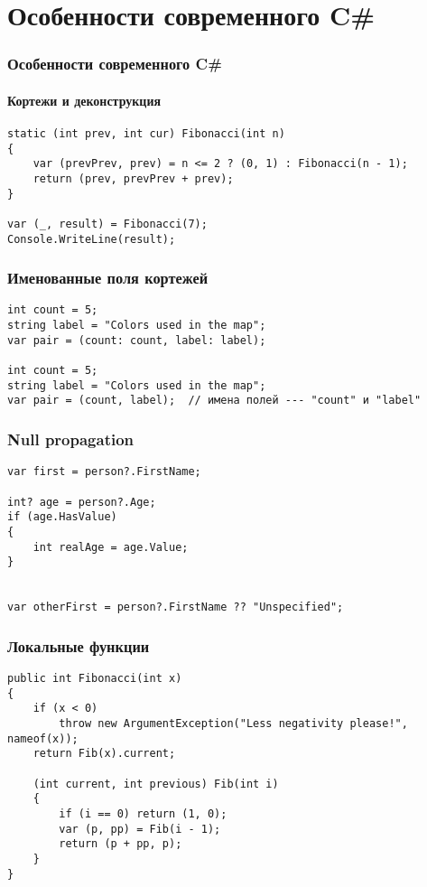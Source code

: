 \documentclass{../../slides-style}
\begin{document}
    \section{Особенности современного C\#}

    \begin{frame}[fragile]
        \frametitle{Особенности современного C\#}
        \framesubtitle{Кортежи и деконструкция}
        \begin{verbatim}
static (int prev, int cur) Fibonacci(int n)
{
    var (prevPrev, prev) = n <= 2 ? (0, 1) : Fibonacci(n - 1);
    return (prev, prevPrev + prev);
}

var (_, result) = Fibonacci(7);
Console.WriteLine(result);
        \end{verbatim}
    \end{frame}

    \begin{frame}[fragile]
        \frametitle{Именованные поля кортежей}
        \begin{verbatim}
int count = 5;
string label = "Colors used in the map";
var pair = (count: count, label: label);

int count = 5;
string label = "Colors used in the map";
var pair = (count, label);  // имена полей --- "count" и "label"
        \end{verbatim}
    \end{frame}

    \begin{frame}[fragile]
        \frametitle{Null propagation}
        \begin{verbatim}
var first = person?.FirstName;

int? age = person?.Age;
if (age.HasValue)
{
    int realAge = age.Value;
}


var otherFirst = person?.FirstName ?? "Unspecified";
        \end{verbatim}
    \end{frame}

    \begin{frame}[fragile]
        \frametitle{Локальные функции}
        \begin{small}
            \begin{verbatim}
public int Fibonacci(int x)
{
    if (x < 0) 
        throw new ArgumentException("Less negativity please!", nameof(x));
    return Fib(x).current;

    (int current, int previous) Fib(int i)
    {
        if (i == 0) return (1, 0);
        var (p, pp) = Fib(i - 1);
        return (p + pp, p);
    }
}
            \end{verbatim}
        \end{small}
    \end{frame}
\end{document}
